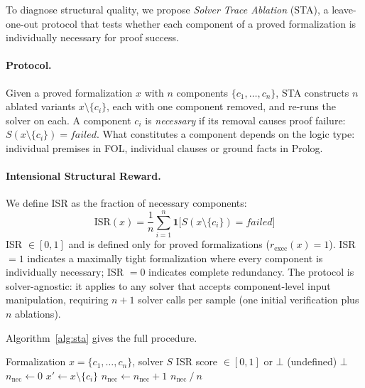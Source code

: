 To diagnose structural quality, we propose \emph{Solver Trace Ablation} (STA), a leave-one-out protocol that tests whether each component of a proved formalization is individually necessary for proof success.

\paragraph{Protocol.}
Given a proved formalization $x$ with $n$ components $\{c_1, \ldots, c_n\}$, STA constructs $n$ ablated variants $x \setminus \{c_i\}$, each with one component removed, and re-runs the solver on each.
A component $c_i$ is \emph{necessary} if its removal causes proof failure: $S(x \setminus \{c_i\}) = \textit{failed}$.
What constitutes a component depends on the logic type: individual premises in FOL, individual clauses or ground facts in Prolog.

\paragraph{Intensional Structural Reward.}
We define ISR as the fraction of necessary components:
\begin{equation}
  \text{ISR}(x) = \frac{1}{n} \sum_{i=1}^{n} \mathbf{1}\bigl[S(x \setminus \{c_i\}) = \textit{failed}\bigr]
  \label{eq:isr}
\end{equation}
ISR $\in [0, 1]$ and is defined only for proved formalizations ($r_{\text{exec}}(x) = 1$).
ISR $= 1$ indicates a maximally tight formalization where every component is individually necessary; ISR $= 0$ indicates complete redundancy.
The protocol is solver-agnostic: it applies to any solver that accepts component-level input manipulation, requiring $n{+}1$ solver calls per sample (one initial verification plus $n$ ablations).

Algorithm~\ref{alg:sta} gives the full procedure.

\begin{algorithm}[t]
\caption{Solver Trace Ablation (STA)}
\label{alg:sta}
\begin{algorithmic}[1]
\REQUIRE Formalization $x = \{c_1, \ldots, c_n\}$, solver $S$
\ENSURE ISR score $\in [0,1]$ or $\bot$ (undefined)
  \RETURN $\bot$
\ENDIF
\STATE $n_{\text{nec}} \gets 0$
  \STATE $x' \gets x \setminus \{c_i\}$
    \STATE $n_{\text{nec}} \gets n_{\text{nec}} + 1$
  \ENDIF
\ENDFOR
\RETURN $n_{\text{nec}} \mathbin{/} n$
\end{algorithmic}
\end{algorithm}

